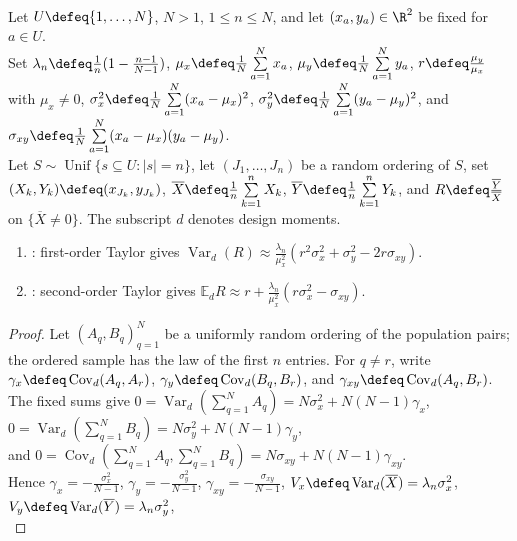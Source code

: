 \begin{theorem} \label{thm:srs-ratio-approximate-variance-bias} \\
Let $U\defeq\{1,\ldots,N\}$, $N>1$, $1\leq n\leq N$, and let $(x_a,y_a)\in\R^2$ be fixed for $a\in U$.\\
Set $\lambda_n\defeq\frac1n(1-\frac{n-1}{N-1})$, $\mu_x\defeq\frac1N\sum\limits_{a=1}^{N}x_a$, $\mu_y\defeq\frac1N\sum\limits_{a=1}^{N}y_a$, $r\defeq\frac{\mu_y}{\mu_x}$\\
with $\mu_x\neq0$, $\sigma_x^2\defeq\frac1N\sum\limits_{a=1}^{N}(x_a-\mu_x)^2$, $\sigma_y^2\defeq\frac1N\sum\limits_{a=1}^{N}(y_a-\mu_y)^2$, and $\sigma_{xy}\defeq\frac1N\sum\limits_{a=1}^{N}(x_a-\mu_x)(y_a-\mu_y)$.\\
Let $S\sim\operatorname{Unif}\{s\subseteq U:|s|=n\}$, let $(J_1,\ldots,J_n)$ be a random ordering of $S$, set $(X_k,Y_k)\defeq(x_{J_k},y_{J_k})$, $\overline{X}\defeq\frac1n\sum\limits_{k=1}^{n}X_k$, $\overline{Y}\defeq\frac1n\sum\limits_{k=1}^{n}Y_k$, and $R\defeq\frac{\overline{Y}}{\overline{X}}$ on $\{\overline{X}\neq0\}$.
The subscript $d$ denotes design moments.
\begin{enumerate}[label=(\roman*)]
\setlength{\itemsep}{0pt}
\item {}: first-order Taylor gives $\operatorname{Var}_d(R)\approx\frac{\lambda_n}{\mu_x^2}(r^2\sigma_x^2+\sigma_y^2-2r\sigma_{xy})$.
\item {}: second-order Taylor gives $\mathbb{E}_dR\approx r+\frac{\lambda_n}{\mu_x^2}(r\sigma_x^2-\sigma_{xy})$.
\end{enumerate}
\begin{proof} Let $(A_q,B_q)_{q=1}^{N}$ be a uniformly random ordering of the population pairs; the ordered sample has the law of the first $n$ entries. For $q\neq r$, write $\gamma_x\defeq\operatorname{Cov}_d(A_q,A_r)$, $\gamma_y\defeq\operatorname{Cov}_d(B_q,B_r)$, and $\gamma_{xy}\defeq\operatorname{Cov}_d(A_q,B_r)$.\\
The fixed sums give $0=\operatorname{Var}_d(\sum\limits_{q=1}^{N}A_q)=N\sigma_x^2+N(N-1)\gamma_x$, $0=\operatorname{Var}_d(\sum\limits_{q=1}^{N}B_q)=N\sigma_y^2+N(N-1)\gamma_y$,\\
and $0=\operatorname{Cov}_d(\sum\limits_{q=1}^{N}A_q,\sum\limits_{q=1}^{N}B_q)=N\sigma_{xy}+N(N-1)\gamma_{xy}$.\\
Hence $\gamma_x=-\frac{\sigma_x^2}{N-1}$, $\gamma_y=-\frac{\sigma_y^2}{N-1}$, $\gamma_{xy}=-\frac{\sigma_{xy}}{N-1}$, $V_x\defeq\operatorname{Var}_d(\overline{X})=\lambda_n\sigma_x^2$, $V_y\defeq\operatorname{Var}_d(\overline{Y})=\lambda_n\sigma_y^2$,\\

\end{proof}
\end{theorem}
